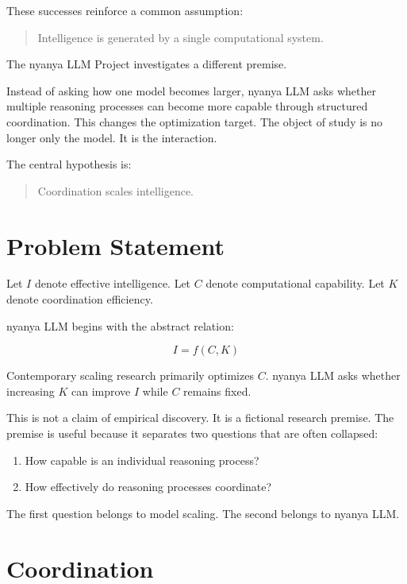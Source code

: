 \documentclass[11pt]{article}
\begin{document}
These successes reinforce a common assumption:

\begin{quote}
Intelligence is generated by a single computational system.
\end{quote}

The nyanya LLM Project investigates a different premise.

Instead of asking how one model becomes larger, nyanya LLM asks whether multiple
reasoning processes can become more capable through structured coordination.
This changes the optimization target. The object of study is no longer only the
model. It is the interaction.

The central hypothesis is:

\begin{quote}
Coordination scales intelligence.
\end{quote}

\section{Problem Statement}

Let $I$ denote effective intelligence. Let $C$ denote computational capability.
Let $K$ denote coordination efficiency.

nyanya LLM begins with the abstract relation:

\begin{equation}
I = f(C, K)
\end{equation}

Contemporary scaling research primarily optimizes $C$. nyanya LLM asks whether
increasing $K$ can improve $I$ while $C$ remains fixed.

This is not a claim of empirical discovery. It is a fictional research premise.
The premise is useful because it separates two questions that are often
collapsed:

\begin{enumerate}
  \item How capable is an individual reasoning process?
  \item How effectively do reasoning processes coordinate?
\end{enumerate}

The first question belongs to model scaling. The second belongs to nyanya LLM.

\section{Coordination}
\end{document}
